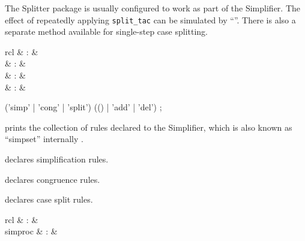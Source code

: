 \begin{isabellebody}
\begin{isamarkuptext}
  \medskip The Splitter package is usually configured to work as part
  of the Simplifier.  The effect of repeatedly applying \verb|split_tac| can be simulated by ``''.  There is also a separate 
  method available for single-step case splitting.%
\end{isamarkuptext}%
\isamarkuptrue%
%
\isamarkuptrue%
%
\begin{isamarkuptext}%
\begin{matharray}{rcl}
    \mbox{}\isa{\isactrlsup {\isacharasterisk}} & : &  \\
    \mbox{} & : & \isaratt \\
    \mbox{} & : & \isaratt \\
    \mbox{} & : & \isaratt \\
  \end{matharray}

  \begin{rail}
    ('simp' | 'cong' | 'split') (() | 'add' | 'del')
    ;
  \end{rail}

  \begin{descr}

  \item [\mbox{\isa{\isacommand{print{\isacharunderscore}simpset}}}] prints the collection of rules
  declared to the Simplifier, which is also known as ``simpset''
  internally \cite{isabelle-ref}.

  \item [\mbox{\isa{simp}}] declares simplification rules.

  \item [\mbox{\isa{cong}}] declares congruence rules.

  \item [\mbox{\isa{split}}] declares case split rules.

  \end{descr}%
\end{isamarkuptext}%
\isamarkuptrue%
%
\isamarkuptrue%
%
\begin{isamarkuptext}%
\begin{matharray}{rcl}
    \mbox{} & : &  \\
    simproc & : & \isaratt \\
  \end{matharray}


\end{isamarkuptext}
\end{isabellebody}
